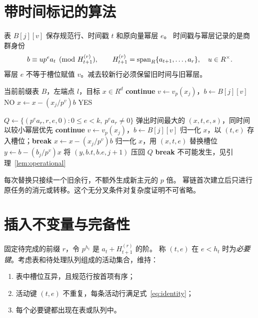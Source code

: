 \documentclass[11pt,a4paper,fontset=fandol]{ctexart}
\theoremstyle{definition}
\theoremstyle{plain}
\begin{document}
\section{带时间标记的算法}
表 $B[j][v]$ 保存规范行、时间戳 $t$ 和原向量幂层 $e$。
时间戳与幂层记录的是商群身份
\begin{equation}\label{eq:identity}
 b\equiv u p^e a_t\pmod{H_{t+1}^{(r)}},\qquad
 H_{t+1}^{(r)}=\operatorname{span}_R\{a_{t+1},\ldots,a_r\},\quad u\in R^\times.
\end{equation}
幂层 $e$ 不等于槽位赋值 $v$。减去较新行必须保留旧时间与旧幂层。

\begin{algorithm}[htbp]
\small
\caption{查询当前前缀的后缀 $[l,r]$}\label{alg:query}
\begin{algorithmic}[1]
\Require 当前前缀表 $B$，左端点 $l$，目标 $x\in R^d$
   \State \textbf{continue} \EndIf
  \State $v\gets v_p(x_j)$，$b\gets B[j][v]$
   \State \Return NO \EndIf
  \State $x\gets x-(x_j/p^v)b$ 
\EndFor
\State \Return YES
\end{algorithmic}
\end{algorithm}

\begin{algorithm}[htbp]
\small
\caption{追加时间为 $r$ 的向量 $a_r$}\label{alg:append}
\begin{algorithmic}[1]
\State $Q\gets\{(p^e a_r,r,e,0):0\le e<k,\ p^e a_r\ne0\}$
  \State 弹出时间最大的 $(x,t,e,s)$，同时间以较小幂层优先
     \State \textbf{continue} \EndIf
    \State $v\gets v_p(x_j)$，$b\gets B[j][v]$
      \State 归一化 $x$，以 $(t,e)$ 存入槽位；\textbf{break}
      \State $x\gets x-(x_j/p^v)b$
      \State 归一化 $x$，用 $(x,t,e)$ 替换槽位
      \State $y\gets b-(b_j/p^v)x$
       \State 将 $(y,b.t,b.e,j+1)$ 压回 $Q$ \EndIf
      \State \textbf{break}
    \Else
      \State 不可能发生，见引理~\ref{lem:operational}
    \EndIf
  \EndFor
\EndWhile
\end{algorithmic}
\end{algorithm}

每次替换只接续一个旧余行，不额外生成新主元的 $p$ 倍。
幂链首次建立后只进行原任务的消元或转移。这个无分叉条件对复杂度证明不可省略。

\section{插入不变量与完备性}
固定待完成的前缀 $r$，令 $p^{h_t}$ 是 $a_t+H_{t+1}^{(r)}$ 的阶。
称 $(t,e)$ 在 $e<h_t$ 时为\emph{必要键}。考虑表和待处理队列组成的活动集合，维持：
\begin{enumerate}[label=(I\arabic*)]
\item 表中槽位互异，且规范行按首项有序；
\item 活动键 $(t,e)$ 不重复，每条活动行满足式~\eqref{eq:identity}；
\item 每个必要键都出现在表或队列中。
\end{enumerate}
\end{document}

